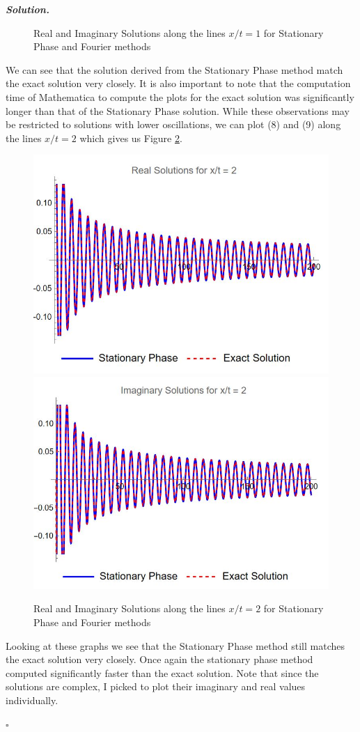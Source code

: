 \documentclass[12pt]{report}
\newenvironment{solution}[1][\it{Solution}]{\textbf{#1. } }{$\square$}
\begin{document}
\begin{solution}
\begin{enumerate}
\begin{figure}
            \caption{Real and Imaginary Solutions along the lines $x/t=1$ for Stationary Phase and Fourier methods}%
            \label{fig:Figure 1}%
        \end{figure}
        We can see that the solution derived from the Stationary Phase method match the exact solution very closely. It is also important to note that the computation time of Mathematica to compute the plots for the exact solution was significantly longer than that of the Stationary Phase solution. While these observations may be restricted to solutions with lower oscillations, we can plot (8) and (9) along the lines $x/t = 2$ which gives us Figure \ref{fig:Figure 2}.
        \begin{figure}%
            \centering
            \includegraphics[width=.4\textwidth]{plots/realx2.JPG}
            \qquad
            \includegraphics[width=.4\textwidth]{plots/fakex2.JPG}
            \caption{Real and Imaginary Solutions along the lines $x/t=2$ for Stationary Phase and Fourier methods}%
            \label{fig:Figure 2}%
        \end{figure} 
        Looking at these graphs we see that the Stationary Phase method still matches the exact solution very closely. Once again the stationary phase method computed significantly faster than the exact solution. Note that since the solutions are complex, I picked to plot their imaginary and real values individually. 


\end{enumerate}
\end{solution}
\end{document}

